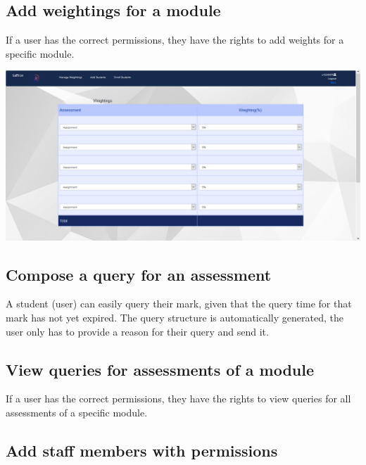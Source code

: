 \documentclass[a4paper,12pt]{article}
\begin{document}
        \subsection{Add weightings for a module}
        
        If a user has the correct permissions, they have the rights to add weights for a specific module. 
        
        \includegraphics[width=1\textwidth]{../images/screens/weightings.PNG}\\[1.0cm]
        
        \subsection{Compose a query for an assessment}
        
        A student (user) can easily query their mark, given that the query time for that mark has not yet expired. The query structure is automatically generated, the user only has to provide a reason for their query and send it.
        
        
        \subsection{View queries for assessments of a module}
        
        If a user has the correct permissions, they have the rights to view queries for all assessments of a specific module.
        
        
        \subsection{Add staff members with permissions}
        
\end{document}
